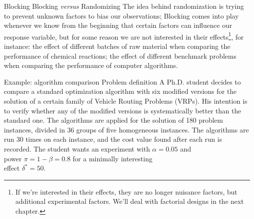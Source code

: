 \documentclass[t]{beamer}
\begin{document}

\begin{ftst}
{Blocking}
{Blocking \textit{versus} Randomizing}
The idea behind randomization is trying to prevent unknown factors to bias our observations;
\vone
Blocking comes into play whenever we know from the beginning that certain factors can influence our response variable, but for some reason we are not interested in their effects\footnote[1]{\tiny If we're interested in their effects, they are no longer nuisance factors, but additional experimental factors. We'll deal with factorial designs in the next chapter.}, for instance:
\vhalf
\bitems the effect of different batches of raw material when comparing the performance of chemical reactions;
\spitem the effect of different benchmark problems when comparing the performance of computer algorithms.
\eitem
\end{ftst}


\begin{ftst}
{Example: algorithm comparison}
{Problem definition}
A Ph.D. student decides to compare a standard optimization algorithm with six modified versions for the solution of a certain family of Vehicle Routing Problems (VRPs). His intention is to verify whether any of the modified versions is systematically better than the standard one.
\vone
The algorithms are applied for the solution of 180 problem instances, divided in 36 groups of five homogeneous instances. The algorithms are run 30 times on each instance, and the cost value found after each run is recorded.
\vone
The student wants an experiment with $\alpha = 0.05$ and\\
power $\pi = 1-\beta = 0.8$ for a minimally interesting\\
effect $\delta^* = 50$.
\end{ftst}
\end{document}
